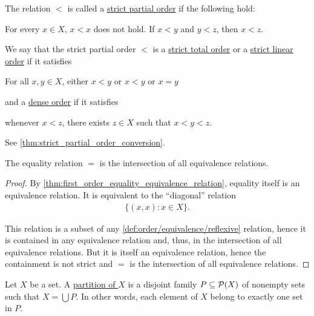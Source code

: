 \begin{definition}
\begin{defenum}
    \item\label{def:order/strict_partial}\cite[168]{Enderton1977} The relation $<$ is called a \ul{strict partial order} if the following hold:
    \begin{description}
       For every $x \in X$, $x < x$ does not hold.
       If $x < y$ and $y < z$, then $x < z$.
    \end{description}

    We say that the strict partial order $<$ is a \ul{strict total order} or a \ul{strict linear order} if it satisfies
    \begin{description}
       For all $x, y \in X$, either $x < y$ or $x < y$ or $x = y$
    \end{description}
    and a \ul{dense order} if it satisfies
    \begin{description}
       whenever $x < z$, there exists $z \in X$ such that $x < y < z$.
    \end{description}

    See \cref{thm:strict_partial_order_conversion}.
  \end{defenum}
\end{definition}

\begin{proposition}\label{thm:equality_is_smallest_equivalence_relation}
  The equality relation $=$ is the intersection of all equivalence relations.
\end{proposition}
\begin{proof}
  By \cref{thm:first_order_equality_equivalence_relation}, equality itself is an equivalence relation. It is equivalent to the \enquote{diagonal} relation
  \begin{align*}
    \{ (x, x) \colon x \in X \}.
  \end{align*}

  This relation is a subset of any \ref{def:order/equivalence/reflexive} relation, hence it is contained in any equivalence relation and, thus, in the intersection of all equivalence relations. But it is itself an equivalence relation, hence the containment is not strict and $=$ is the intersection of all equivalence relations.
\end{proof}

\begin{definition}\label{def:set_partition}
  Let $X$ be a set. A \ul{partition of $X$} is a disjoint family $P \subseteq \operatorname{\mathcal P}(X)$ of nonempty sets such that $X = \bigcup P$. In other words, each element of $X$ belong to exactly one set in $P$.
\end{definition}

